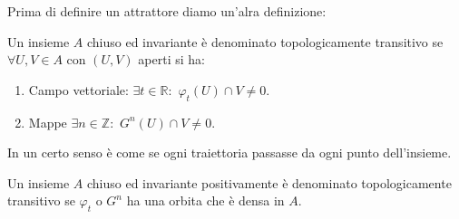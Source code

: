 \noindent
Prima di definire un attrattore diamo un'alra definizione:
\begin{defn}
    Un insieme $A$ chiuso ed invariante è denominato topologicamente transitivo se $\forall U, V \in A$ con $(U, V)$ aperti si ha:
    \begin{enumerate}
	\item Campo vettoriale: $\exists t \in \mathbb{R}: $ $\varphi_t(U) \cap V \neq 0$.
	\item Mappe $\exists n \in \mathbb{Z}:$ $G^n(U) \cap V \neq 0$.
    \end{enumerate}
\end{defn}
\noindent
In un certo senso è come se ogni traiettoria passasse da ogni punto dell'insieme.
\begin{defn}
    Un insieme $A$ chiuso ed invariante positivamente è denominato topologicamente transitivo se  $\varphi_t$ o $G^n$ ha una orbita che è densa in $A$.
\end{defn}
\noindent
